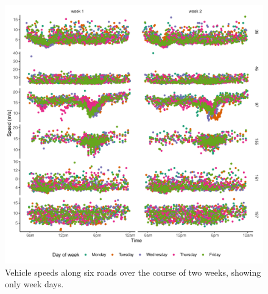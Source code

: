 \begin{knitrout}\small
{}\color{fgcolor}\begin{figure}

{\centering \includegraphics[width=\linewidth]{figure/tt_week1_load-1} 

}

\caption[Vehicle speeds along six roads over the course of two weeks, showing only week days]{Vehicle speeds along six roads over the course of two weeks, showing only week days.}\label{fig:tt_week1_load}
\end{figure}


\end{knitrout}

